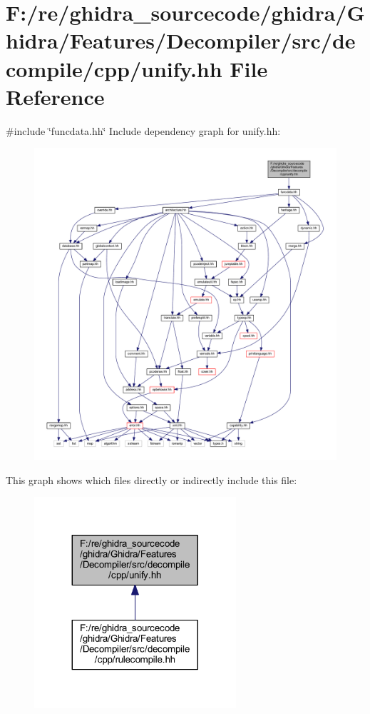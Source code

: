 \hypertarget{unify_8hh}{}\section{F\+:/re/ghidra\+\_\+sourcecode/ghidra/\+Ghidra/\+Features/\+Decompiler/src/decompile/cpp/unify.hh File Reference}
\label{unify_8hh}
{\ttfamily \#include \char`\"{}funcdata.\+hh\char`\"{}}\newline
Include dependency graph for unify.\+hh\+:
\nopagebreak
\begin{figure}[H]
\begin{center}
\leavevmode
\includegraphics[width=350pt]{unify_8hh__incl}
\end{center}
\end{figure}
This graph shows which files directly or indirectly include this file\+:
\nopagebreak
\begin{figure}[H]
\begin{center}
\leavevmode
\includegraphics[width=212pt]{unify_8hh__dep__incl}
\end{center}
\end{figure}
